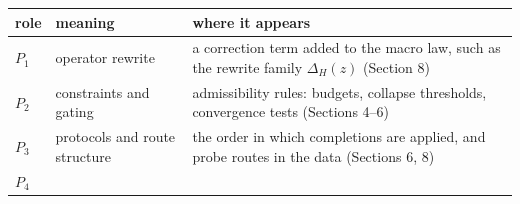 \begin{longtable}[]{@{}lll@{}}
\toprule
\begin{minipage}[b]{0.05\columnwidth}\raggedright
role\strut
\end{minipage} & \begin{minipage}[b]{0.26\columnwidth}\raggedright
meaning\strut
\end{minipage} & \begin{minipage}[b]{0.60\columnwidth}\raggedright
where it appears\strut
\end{minipage}\tabularnewline
\midrule
\endhead
\begin{minipage}[t]{0.05\columnwidth}\raggedright
\(P_1\)\strut
\end{minipage} & \begin{minipage}[t]{0.26\columnwidth}\raggedright
operator rewrite\strut
\end{minipage} & \begin{minipage}[t]{0.60\columnwidth}\raggedright
a correction term added to the macro law, such as the rewrite family
\(\Delta_H(z)\) (Section 8)\strut
\end{minipage}\tabularnewline
\begin{minipage}[t]{0.05\columnwidth}\raggedright
\(P_2\)\strut
\end{minipage} & \begin{minipage}[t]{0.26\columnwidth}\raggedright
constraints and gating\strut
\end{minipage} & \begin{minipage}[t]{0.60\columnwidth}\raggedright
admissibility rules: budgets, collapse thresholds, convergence tests
(Sections 4--6)\strut
\end{minipage}\tabularnewline
\begin{minipage}[t]{0.05\columnwidth}\raggedright
\(P_3\)\strut
\end{minipage} & \begin{minipage}[t]{0.26\columnwidth}\raggedright
protocols and route structure\strut
\end{minipage} & \begin{minipage}[t]{0.60\columnwidth}\raggedright
the order in which completions are applied, and probe routes in the data
(Sections 6, 8)\strut
\end{minipage}\tabularnewline
\begin{minipage}[t]{0.05\columnwidth}\raggedright
\(P_4\)\strut
\end{minipage} & \begin{minipage}[t]{0.26\columnwidth}\raggedright

\end{minipage}
\end{longtable}
